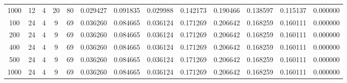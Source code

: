 \begin{table}[h]
\begin{tabular}{ccccccccccccc}
1000 & 12 & 4 & 20 & 80 & 0.029427 & 0.091835 & 0.029988 & 0.142173 & 0.190466 & 0.138597 & 0.115137 & 0.000000 \\
100 & 24 & 4 & 9 & 69 & 0.036260 & 0.084665 & 0.036124 & 0.171269 & 0.206642 & 0.168259 & 0.160111 & 0.000000 \\
200 & 24 & 4 & 9 & 69 & 0.036260 & 0.084665 & 0.036124 & 0.171269 & 0.206642 & 0.168259 & 0.160111 & 0.000000 \\
400 & 24 & 4 & 9 & 69 & 0.036260 & 0.084665 & 0.036124 & 0.171269 & 0.206642 & 0.168259 & 0.160111 & 0.000000 \\
500 & 24 & 4 & 9 & 69 & 0.036260 & 0.084665 & 0.036124 & 0.171269 & 0.206642 & 0.168259 & 0.160111 & 0.000000 \\
1000 & 24 & 4 & 9 & 69 & 0.036260 & 0.084665 & 0.036124 & 0.171269 & 0.206642 & 0.168259 & 0.160111 & 0.000000 \\
\bottomrule
\end{tabular}
\end{table}
